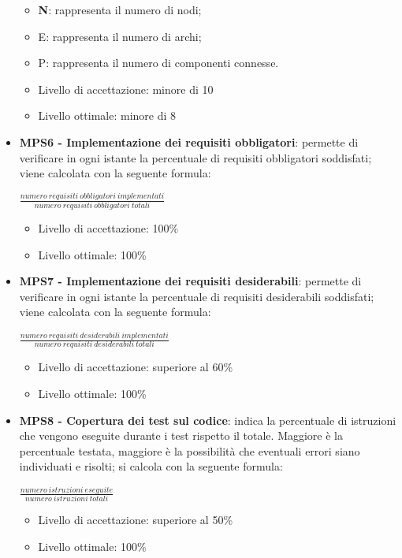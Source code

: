 \begin{itemize}
    	\begin{itemize}
    	    \item \textbf{N}: rappresenta il numero di nodi;
    	    \item E: rappresenta il numero di archi;
    	    \item P: rappresenta il numero di componenti connesse.
    	\end{itemize}
    	  \begin{itemize}
	 \item Livello di accettazione: minore di 10
	 \item Livello ottimale: minore di 8
	 \end{itemize}
		\item \textbf{MPS6 - Implementazione dei requisiti obbligatori}: permette di verificare in ogni istante la percentuale di requisiti obbligatori soddisfati; viene calcolata con la seguente formula: 
		\begin{center}
		$\frac{numero\ requisiti\ obbligatori\ implementati}{numero\ requisiti\ obbligatori\ totali}$
	\end{center}
	\begin{itemize}
	 \item Livello di accettazione: 100\%
	 \item Livello ottimale: 100\%
	 \end{itemize}
		\item \textbf{MPS7 - Implementazione dei requisiti desiderabili}: permette di verificare in ogni istante la percentuale di requisiti desiderabili soddisfati; viene calcolata con la seguente formula: 
		\begin{center}
		$\frac{numero\ requisiti\ desiderabili\ implementati}{numero\ requisiti\ desiderabili\ totali}$
	\end{center}
	\begin{itemize}
	 \item Livello di accettazione: superiore al 60\%
	 \item Livello ottimale: 100\%
	 \end{itemize}
		\item \textbf{MPS8 - Copertura dei test sul codice}: indica la percentuale di istruzioni che vengono eseguite durante i test rispetto il totale. Maggiore è la percentuale testata, maggiore è la possibilità che eventuali errori siano individuati e risolti; si calcola con la seguente formula:
		\begin{center}
		$\frac{numero\ istruzioni\ eseguite}{numero\ istruzioni\ totali}$	
		\end{center}
	\begin{itemize}
	 \item Livello di accettazione: superiore al 50\%
	 \item Livello ottimale: 100\%
	 \end{itemize}
	 

\end{itemize}
